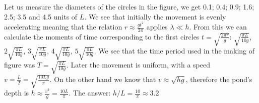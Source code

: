{\ifEngSolution
Let us measure the diameters of the circles in the figure, we get 0.1; 0.4; 0.9; 1.6; 2.5; 3.5 and 4.5 units of $L$. We see that initially the movement is evenly accelerating meaning that the relation $r \approx \frac{gt^2}{2 \pi}$ applies $\lambda \ll h$. From this we can calculate the moments of time corresponding to the first circles $t = \sqrt{\frac{2 \pi r}{g}}$: $\sqrt{\frac{\pi L}{10 g}}$, $2 \sqrt{\frac{\pi L}{10 g}}$, $3 \sqrt{\frac{\pi L}{10 g}}$, $4 \sqrt{\frac{\pi L}{10 g}}$, $5 \sqrt{\frac{\pi L}{10 g}}$. We see that the time period used in the making of figure was $T=\sqrt{\frac{\pi L}{10 g}}$. Later the movement is uniform, with a speed $v=\frac{L}{T}=\sqrt{\frac{10 L g}{\pi}}$. On the other hand we know that $v \approx \sqrt{hg}$, therefore the pond's depth is $h \approx \frac{v^2}{g} = \frac{10 L}{\pi}$. The answer: $h/L = \frac{10}{\pi} \approx \SI{3,2}{}$
\fi
}
